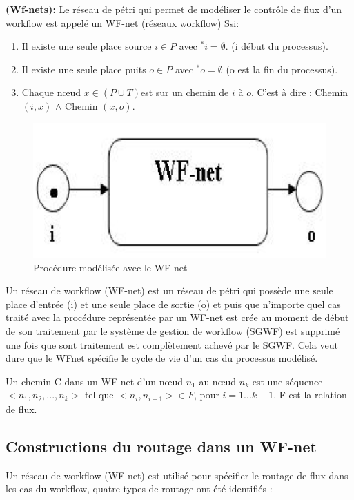 \begin{defn}
	\textbf{(Wf-nets):}  Le réseau de pétri qui permet de modéliser le contrôle de flux d’un workflow est appelé un WF-net  (réseaux workflow) Ssi:\parencite{Rdp}
	
	\begin{enumerate}
		\item Il existe une seule place source $i \in P$ avec $ ^{*}i = \emptyset $.  (i début du processus).
		
		\item  Il existe une seule place puits $o \in P$ avec $ ^{*}o = \emptyset $  (o est la fin du processus).
		
		\item  Chaque nœud $x \in (P \cup T) $est sur un chemin de $i$ à $o$. C’est à dire : Chemin $(i, x)$ $\wedge$ Chemin $(x, o)$.
		
		
		
	\end{enumerate} 
	
	\begin{figure}[H]
		\centering
		\includegraphics[width=0.5\linewidth]{images/wf-nete006}
		\caption{ Procédure modélisée avec le WF-net }
		\label{fig:wf-nete006}
	\end{figure}
	
\end{defn}
Un réseau de workflow (WF-net) est un réseau de pétri qui possède une seule place d’entrée (i) et une seule place de sortie (o) et puis que n’importe quel cas traité avec la procédure représentée par un WF-net est crée au moment de début de son traitement par le système de gestion de workflow (SGWF) est supprimé une fois que sont traitement est complètement achevé par le SGWF. Cela veut dure que le WFnet spécifie le cycle de vie d’un cas du processus modélisé.  \parencite{Rdp}
\begin{rem}
	Un chemin C dans un WF-net d’un nœud $n_{1}$ au nœud $n_{k}$ est une séquence $<n_{1},n_{2},...,n_{k}>$ tel-que $<n_{i},n_{i+1}> \in F $, pour $i=1...k-1$.
	F est la relation de flux. 
\end{rem}

\subsection{Constructions du routage dans un WF-net}
Un réseau de workflow (WF-net) est utilisé pour spécifier le routage de flux dans les cas du workflow, quatre types de routage ont été identifiés :\parencite{Rdp}

